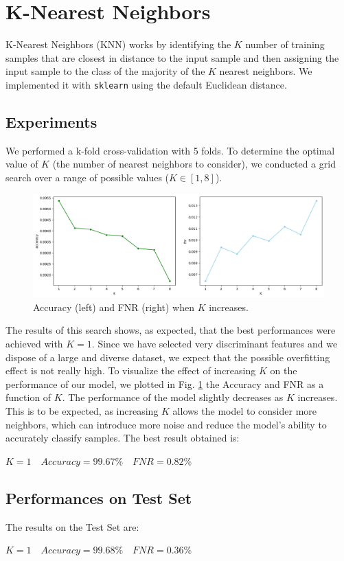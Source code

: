 \documentclass[twocolumn, switch]{article} %
\newcommand\x{0.7}
\begin{document}
\section{K-Nearest Neighbors}
\label{sec:knn}
K-Nearest Neighbors (KNN) works by identifying the $K$ number of training samples that are closest in distance to the input sample and then assigning the input sample to the class of the majority of the $K$ nearest neighbors. We implemented it with \texttt{sklearn} \cite{scikit-learn} using the default Euclidean distance.
\subsection{Experiments}
We performed a k-fold cross-validation with 5 folds.
To determine the optimal value of $K$ (the number of nearest neighbors to consider), we conducted a grid search over a range of possible values ($K \in [1, 8]$).
\begin{figure}[ht!]
	\centering
	\includegraphics[width=\x\linewidth]{knn_accuracy_fnr.png}
	\caption{Accuracy (left) and FNR (right) when $K$ increases.}
	\label{fig:knntrain}
\end{figure}
The results of this search shows, as expected, that the best performances were achieved with $K=1$. Since we have selected very discriminant features and we dispose of a large and diverse dataset, we expect that the possible overfitting effect is not really high.
To visualize the effect of increasing $K$ on the performance of our model, we plotted in Fig. \ref{fig:knntrain} the Accuracy and FNR as a function of $K$. The performance of the model slightly decreases as $K$ increases. This is to be expected, as increasing $K$ allows the model to consider more neighbors, which can introduce more noise and reduce the model's ability to accurately classify samples. The best result obtained is:
\begin{center}
	$K=1 \quad Accuracy=99.67\% \quad FNR=0.82\%$
\end{center}

\subsection{Performances on Test Set}
The results on the Test Set are:
\begin{center}
	$K=1 \quad Accuracy=99.68\% \quad FNR=0.36\%$
\end{center}
\end{document}
